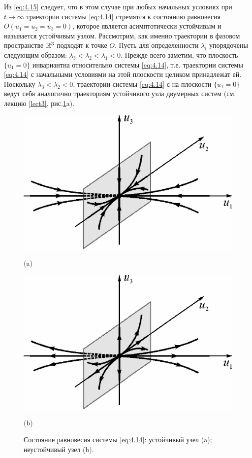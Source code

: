 Из \eqref{eq:4.15} следует, что в этом случае при любых начальных условиях при $t \to \infty$ траектории системы \eqref{eq:4.14} стремятся к состоянию равновесия $O (u_1=u_2=u_3=0)$, которое является асимптотически устойчивым и называется устойчивым узлом. Рассмотрим, как именно траектории в фазовом пространстве $\mathbb{R}^3$ подходят к точке $O$. Пусть для определенности $\lambda_i$ упорядочены следующим образом: $\lambda_3< \lambda_2< \lambda_1<0$. Прежде всего заметим,
что плоскость $\{ u_1 =0 \}$ инвариантна относительно системы \eqref{eq:4.14}, т.е. траектории системы \eqref{eq:4.14} с начальными условиями на этой плоскости целиком принадлежат ей. 
Поскольку $\lambda_3< \lambda_2<0$, траектории системы \eqref{eq:4.14} с на плоскости $\{ u_1 =0\}$   ведут себя аналогично траекториям устойчивого узла двумерных систем (см. лекцию \ref{lect3}, рис.\ref{fig:4.2}a). 
\begin{figure}[h!]
        \centering
        \begin{minipage}{0.45\linewidth}
                \centering  
                \includegraphics[]{fig/lect4/2a}

                (a)
        \end{minipage}
        \begin{minipage}{0.45\linewidth}
                \centering  
                \includegraphics[]{fig/lect4/2b}

                (b)      
        \end{minipage}
        \caption{Состояние равновесия системы \eqref{eq:4.14}: устойчивый узел (a); неустойчивый узел (b). }
        \label{fig:4.2}
\end{figure}
